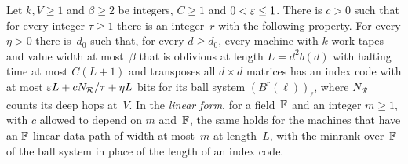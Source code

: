 \begin{conjecture}\label{conj:HV}
Let $k,V\ge1$ and $\beta\ge2$ be integers, $C\ge1$ and $0<\varepsilon\le1$. There is $c>0$ such that for every integer
$\tau\ge1$ there is an integer~$r$ with the following property. For every $\eta>0$ there is~$d_0$ such that, for every
$d\ge d_0$, every machine with $k$ work tapes and value width at most~$\beta$ that is oblivious at length $L=d^2b(d)$
with halting time at most $C(L+1)$ and transposes all $d\times d$ matrices has an index code with at most
$\varepsilon L+cN_{\mathcal R}/\tau+\eta L$ bits for its ball system $(B^r(\ell))_\ell$, where $N_{\mathcal R}$ counts its deep
hops at~$V$. In the \emph{linear form}, for a field~$\mathbb{F}$ and an integer $m\ge1$, with $c$ allowed to depend on $m$
and~$\mathbb{F}$, the same holds for the machines that have an $\mathbb{F}$-linear data path of width at most~$m$ at length~$L$, with the
minrank over~$\mathbb{F}$ of the ball system in place of the length of an index code.
\end{conjecture}

